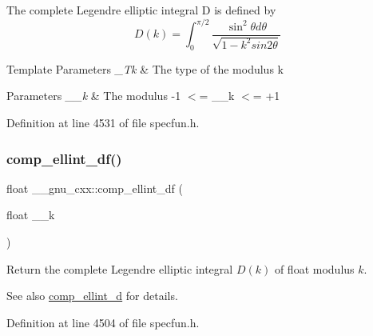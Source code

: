 The complete Legendre elliptic integral D is defined by \[ D(k) = \int_0^{\pi/2} \frac{\sin^2\theta d\theta}{\sqrt{1-k^2sin2\theta}} \]


\begin{DoxyTemplParams}{Template Parameters}
{\em \+\_\+\+Tk} & The type of the modulus {\ttfamily k} \\
\hline
\end{DoxyTemplParams}

\begin{DoxyParams}{Parameters}
{\em \+\_\+\+\_\+k} & The modulus {\ttfamily -\/1 $<$= \+\_\+\+\_\+k $<$= +1} \\
\hline
\end{DoxyParams}


Definition at line 4531 of file specfun.\+h.

\mbox{\label{group__gnu__math__spec__func_ga34ac6488b0e7531d5d4b7a8e31ff864e}} 
\subsubsection{\texorpdfstring{comp\+\_\+ellint\+\_\+df()}{comp\_ellint\_df()}}
{\footnotesize\ttfamily float \+\_\+\+\_\+gnu\+\_\+cxx\+::comp\+\_\+ellint\+\_\+df (\begin{DoxyParamCaption}\item[{float}]{\+\_\+\+\_\+k }\end{DoxyParamCaption})\hspace{0.3cm}{\ttfamily [inline]}}

Return the complete Legendre elliptic integral $ D(k) $ of {\ttfamily float} modulus $ k $.

\begin{DoxySeeAlso}{See also}
\hyperlink{group__gnu__math__spec__func_ga3fe79a91524b43ffc5ffb83c0eb2bd00}{comp\+\_\+ellint\+\_\+d} for details. 
\end{DoxySeeAlso}


Definition at line 4504 of file specfun.\+h.

\mbox{\label{group__gnu__math__spec__func_ga494931ec0a271b79f1fdcfdf929e3138}} 
